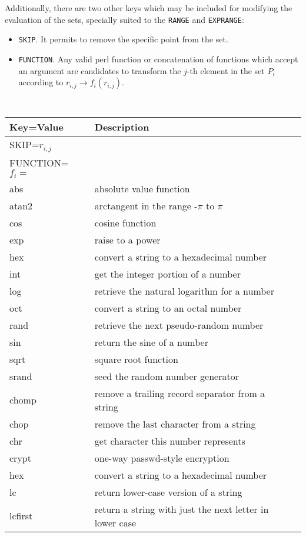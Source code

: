 \documentclass[12pt,a4paper]{article}
\begin{document}
Additionally, there are two other keys which may be included for modifying the evaluation of the sets, specially suited to the {\tt RANGE} and {\tt EXPRANGE}:
\begin{itemize}
\item{\tt SKIP}. It permits to remove the specific point from the set.
\item{\tt FUNCTION}. Any valid perl function or concatenation of functions which accept an argument are candidates to transform the $j$-th element in the set $P_i$ according to $r_{i,j} \to f_i(r_{i,j})$.
\end{itemize}
\begin{table}[!ht]
\center
{\tt
\begin{tabular}{lll}
\hline
\textrm{Key=Value} & \textrm{Description}\\
\hline
SKIP=$r_{i,j}$&\\
FUNCTION=$f_i=$ &\\
 abs&{\rm absolute value function}\\
 atan2&{\rm arctangent in the range -$\pi$ to $\pi$}\\
 cos&{\rm cosine function}\\
 exp&{\rm raise to a power}\\
  hex&{\rm convert a string to a hexadecimal number}\\
 int&{\rm get the integer portion of a number}\\
 log&{\rm retrieve the natural logarithm for a number}\\
 oct&{\rm convert a string to an octal number}\\
 rand&{\rm retrieve the next pseudo-random number}\\
 sin&{\rm return the sine of a number}\\
 sqrt&{\rm square root function}\\
 srand&{\rm seed the random number generator}\\
 chomp&{\rm remove a trailing record separator from a string}\\
 chop&{\rm remove the last character from a string}\\
 chr&{\rm get character this number represents}\\
 crypt&{\rm one-way passwd-style encryption}\\
 hex&{\rm convert a string to a hexadecimal number}\\
 lc&{\rm return lower-case version of a string}\\
 lcfirst&{\rm return a string with just the next letter in lower case}\\

\end{tabular}}
\end{table}
\end{document}
